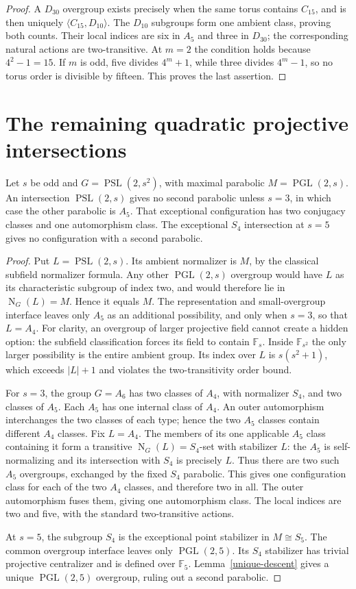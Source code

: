\documentclass[11pt]{article}
\newcommand{\PSL}{\operatorname{PSL}}\newcommand{\PGL}{\operatorname{PGL}}
\newcommand{\N}{\operatorname{N}}\newcommand{\F}{\mathbb F}
\begin{document}
\begin{proof}
A $D_{30}$ overgroup exists precisely when the same torus contains
$C_{15}$, and is then uniquely $\langle C_{15},D_{10}\rangle$.
The $D_{10}$ subgroups form one ambient class, proving both counts.
Their local indices are six in $A_5$ and three in $D_{30}$;
the corresponding natural actions are two-transitive. At $m=2$
the condition holds because $4^2-1=15$. If $m$ is odd, five
divides $4^m+1$, while three divides $4^m-1$, so no torus order
is divisible by fifteen. This proves the last assertion.
\end{proof}

\section{The remaining quadratic projective intersections}
\begin{theorem}\label{quadratic}
Let $s$ be odd and $G=\PSL(2,s^2)$, with maximal parabolic
$M=\PGL(2,s)$. An intersection $\PSL(2,s)$ gives no second
parabolic unless $s=3$, in which case the other parabolic is $A_5$.
That exceptional configuration has two conjugacy classes and one
automorphism class. The exceptional $S_4$ intersection at $s=5$
gives no configuration with a second parabolic.
\end{theorem}
\begin{proof}
Put $L=\PSL(2,s)$. Its ambient normalizer is $M$, by the
classical subfield normalizer formula. Any other $\PGL(2,s)$
overgroup would have $L$ as its characteristic subgroup of index
two, and would therefore lie in $\N_G(L)=M$. Hence it equals $M$.
The representation and small-overgroup interface leaves only $A_5$
as an additional possibility, and only when $s=3$, so that $L=A_4$.
For clarity, an overgroup of larger projective field cannot create
a hidden option: the subfield classification forces its field to
contain $\F_s$. Inside $\F_{s^2}$ the only larger possibility is
the entire ambient group. Its index over $L$ is $s(s^2+1)$,
which exceeds $|L|+1$ and violates the two-transitivity order bound.

For $s=3$, the group $G=A_6$ has two classes of $A_4$, with
normalizer $S_4$, and two classes of $A_5$. Each $A_5$ has one
internal class of $A_4$. An outer automorphism interchanges the two
classes of each type; hence the two $A_5$ classes contain different
$A_4$ classes. Fix $L=A_4$. The members of its one applicable
$A_5$ class containing it form a transitive $\N_G(L)=S_4$-set
with stabilizer $L$: the $A_5$ is self-normalizing and its
intersection with $S_4$ is precisely $L$. Thus there are two
such $A_5$ overgroups, exchanged by the fixed $S_4$ parabolic.
This gives one configuration class for each of the two $A_4$
classes, and therefore two in all. The outer automorphism fuses them,
giving one automorphism class. The local indices are two and five,
with the standard two-transitive actions.

At $s=5$, the subgroup $S_4$ is the exceptional point stabilizer
in $M\cong S_5$. The common overgroup interface leaves only
$\PGL(2,5)$. Its $S_4$ stabilizer has trivial projective centralizer and
is defined over $\F_5$. Lemma~\ref{unique-descent} gives a unique
$\PGL(2,5)$ overgroup, ruling out a second parabolic.
\end{proof}
\end{document}
